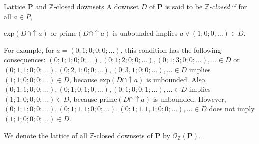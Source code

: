 \documentclass[professionalfont, 12pt]{beamer} %
\theoremstyle{plain}
\theoremstyle{definition}
\newcommand{\m}[1]{{\mathbf {#1} }}
\newcommand{\jn}{\vee}
\newcommand{\bb}[1]{\mathbb {#1}}
\begin{document}
\begin{frame}{Lattice $\m P$ and $\bb{Z}$-closed downsets}
A downset $D$ of $\m{P}$ is said to be \emph{$\bb{Z}$-closed} if for all $a \in P$, 
\begin{center}
$\text{exp}(D \cap {\uparrow} a)$ or $\text{prime}(D \cap {\uparrow} a)$ is unbounded implies $a \jn (1; 0; 0; \ldots) \in D$.
\end{center}
 
For example, for $a = (0;1;0;0;0;...)$, this condition has the following consequences:
$(0;1;1;0;0;\ldots), (0;1;2;0;0;\ldots), (0;1;3;0;0;\ldots), \ldots \in D$
or
$(0;1,1;0;0;\ldots), (0;2,1;0;0;\ldots), (0;3,1;0;0;\ldots), \ldots \in D$
implies $(1;1;0;0;0;\ldots) \in D$, because $\text{exp}(D \cap {\uparrow} a)$ is unbounded.
\pause
Also,
$(0;1;1;0;0;\ldots), (0;1;0;1;0;\ldots), (0;1;0;0;1;\ldots), \ldots \in D$
implies $(1;1;0;0;0;\ldots) \in D$, because $\text{prime}(D \cap {\uparrow} a)$ is unbounded.\pause
However,
$(0;1;1;0;0;\ldots), (0;1;1,1;0;0;\ldots), (0;1;1,1,1;0;0;\ldots), \ldots \in D$
does not imply $(1;1;0;0;0;\ldots) \in D$.

We denote the lattice of all $\bb{Z}$-closed downsets of $\m{P}$ by $\mathcal{O}_{\bb{Z}}(\m{P})$.
\end{frame}
\end{document}
